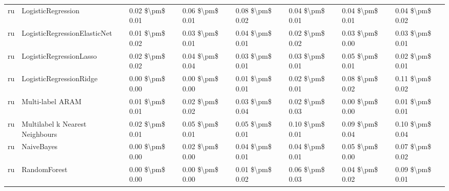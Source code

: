 \begin{tabular}{llllllll}
      ru &              LogisticRegression & 0.02 \$\textbackslash pm\$ 0.01 &           0.06 \$\textbackslash pm\$ 0.01 &       0.08 \$\textbackslash pm\$ 0.02 &        0.04 \$\textbackslash pm\$ 0.01 &                         0.04 \$\textbackslash pm\$ 0.01 &     0.04 \$\textbackslash pm\$ 0.02 \\
      ru &    LogisticRegressionElasticNet & 0.01 \$\textbackslash pm\$ 0.02 &           0.03 \$\textbackslash pm\$ 0.01 &       0.04 \$\textbackslash pm\$ 0.01 &        0.02 \$\textbackslash pm\$ 0.02 &                         0.03 \$\textbackslash pm\$ 0.00 &     0.03 \$\textbackslash pm\$ 0.01 \\
      ru &         LogisticRegressionLasso & 0.02 \$\textbackslash pm\$ 0.02 &           0.04 \$\textbackslash pm\$ 0.04 &       0.03 \$\textbackslash pm\$ 0.01 &        0.03 \$\textbackslash pm\$ 0.01 &                         0.05 \$\textbackslash pm\$ 0.01 &     0.02 \$\textbackslash pm\$ 0.01 \\
      ru &         LogisticRegressionRidge & 0.00 \$\textbackslash pm\$ 0.00 &           0.00 \$\textbackslash pm\$ 0.00 &       0.01 \$\textbackslash pm\$ 0.01 &        0.02 \$\textbackslash pm\$ 0.01 &                         0.08 \$\textbackslash pm\$ 0.02 &     0.11 \$\textbackslash pm\$ 0.02 \\
      ru &                Multi-label ARAM & 0.01 \$\textbackslash pm\$ 0.01 &           0.02 \$\textbackslash pm\$ 0.02 &       0.03 \$\textbackslash pm\$ 0.04 &        0.02 \$\textbackslash pm\$ 0.03 &                         0.00 \$\textbackslash pm\$ 0.00 &     0.01 \$\textbackslash pm\$ 0.01 \\
      ru & Multilabel k Nearest Neighbours & 0.02 \$\textbackslash pm\$ 0.01 &           0.05 \$\textbackslash pm\$ 0.01 &       0.05 \$\textbackslash pm\$ 0.01 &        0.10 \$\textbackslash pm\$ 0.01 &                         0.09 \$\textbackslash pm\$ 0.04 &     0.10 \$\textbackslash pm\$ 0.04 \\
      ru &                      NaiveBayes & 0.00 \$\textbackslash pm\$ 0.00 &           0.02 \$\textbackslash pm\$ 0.00 &       0.04 \$\textbackslash pm\$ 0.01 &        0.04 \$\textbackslash pm\$ 0.01 &                         0.05 \$\textbackslash pm\$ 0.00 &     0.07 \$\textbackslash pm\$ 0.02 \\
      ru &                    RandomForest & 0.00 \$\textbackslash pm\$ 0.00 &           0.00 \$\textbackslash pm\$ 0.00 &       0.01 \$\textbackslash pm\$ 0.02 &        0.06 \$\textbackslash pm\$ 0.03 &                         0.04 \$\textbackslash pm\$ 0.02 &     0.09 \$\textbackslash pm\$ 0.01 \\

\end{tabular}

